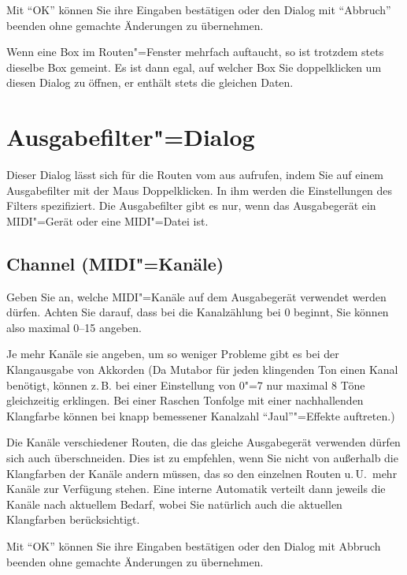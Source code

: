 Mit "`OK"' können Sie ihre Eingaben bestätigen oder den Dialog 
mit "`Abbruch"' beenden ohne gemachte Änderungen zu übernehmen.

Wenn eine Box im Routen"=Fenster mehrfach auftaucht, so ist trotzdem
stets dieselbe Box gemeint. Es ist dann egal, auf welcher Box Sie
doppelklicken um diesen Dialog zu öffnen, er enthält stets die
gleichen Daten.

\section{Ausgabefilter"=Dialog}\label{sec:DE_R3}
Dieser Dialog lässt sich für die Routen vom  
aus aufrufen, indem Sie auf einem Ausgabefilter mit der Maus 
Doppelklicken. In ihm werden die Einstellungen des Filters spezifiziert. 
Die Ausgabefilter gibt es nur, wenn das Ausgabegerät ein MIDI"=Gerät 
oder eine MIDI"=Datei ist.

\subsection{Channel (MIDI"=Kanäle)}
Geben Sie an, welche MIDI"=Kanäle auf dem Ausgabegerät verwendet 
werden dürfen. Achten Sie darauf, dass bei \mutabor{} die 
Kanalzählung bei 0 beginnt, Sie können also maximal 0--15 
angeben.

Je mehr Kanäle sie angeben, um so weniger Probleme gibt es bei der
Klangausgabe von Akkorden (Da Mutabor für jeden klingenden Ton einen
Kanal benötigt, können z.\,B. bei einer Einstellung von 0"=7 nur maximal
8 Töne gleichzeitig erklingen. Bei einer Raschen Tonfolge mit einer
nachhallenden Klangfarbe können bei knapp bemessener Kanalzahl
"`Jaul"'"=Effekte auftreten.)

Die Kanäle verschiedener Routen, die das gleiche Ausgabegerät 
verwenden dürfen sich auch überschneiden. Dies ist zu empfehlen, 
wenn Sie nicht von außerhalb die Klangfarben der Kanäle andern 
müssen, das so den einzelnen Routen u.\,U.\ mehr Kanäle zur 
Verfügung stehen. Eine interne Automatik verteilt dann jeweils 
die Kanäle nach aktuellem Bedarf, wobei Sie natürlich auch 
die aktuellen Klangfarben berücksichtigt.

Mit "`OK"' können Sie ihre Eingaben bestätigen oder den Dialog 
mit Abbruch beenden ohne gemachte Änderungen zu übernehmen.

